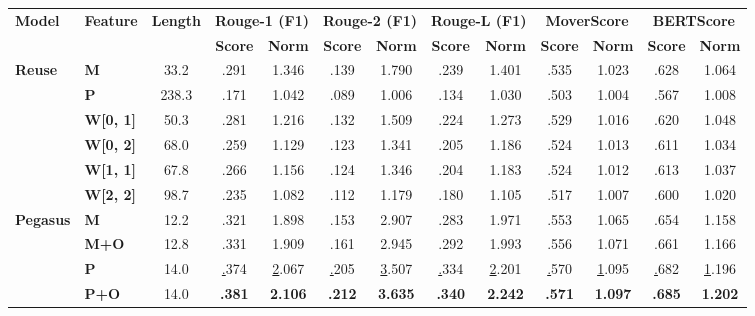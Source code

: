 \begin{table}[]
\centering \small
\addtolength{\tabcolsep}{-1.0mm}
\begin{tabular}{@{}llccccccccccc@{}}
\toprule
\multirow{2}{*}{\textbf{Model}} & \multirow{2}{*}{\textbf{Feature}} & \multirow{2}{*}{\textbf{Length}} & \multicolumn{2}{c}{\textbf{Rouge-1 (F1)}} & \multicolumn{2}{c}{\textbf{Rouge-2 (F1)}} & \multicolumn{2}{c}{\textbf{Rouge-L (F1)}} & \multicolumn{2}{c}{\textbf{MoverScore}} & \multicolumn{2}{c}{\textbf{BERTScore}} \\ \cmidrule(l){4-13}
 &  &  & \textbf{Score} & \textbf{Norm} & \textbf{Score} & \textbf{Norm} & \textbf{Score} & \textbf{Norm} & \textbf{Score} & \textbf{Norm} & \textbf{Score} & \textbf{Norm} \\ \midrule
\multirow{6}{*}{\textbf{Reuse}} & \textbf{M} & 33.2 & .291 & 1.346 & .139 & 1.790 & .239 & 1.401 & .535 & 1.023 & .628 & 1.064 \\
 & \textbf{P} & 238.3 & .171 & 1.042 & .089 & 1.006 & .134 & 1.030 & .503 & 1.004 & .567 & 1.008 \\
 & \textbf{W{[}0, 1{]}} & 50.3 & .281 & 1.216 & .132 & 1.509 & .224 & 1.273 & .529 & 1.016 & .620 & 1.048 \\
 & \textbf{W{[}0, 2{]}} & 68.0 & .259 & 1.129 & .123 & 1.341 & .205 & 1.186 & .524 & 1.013 & .611 & 1.034 \\
 & \textbf{W{[}1, 1{]}} & 67.8 & .266 & 1.156 & .124 & 1.346 & .204 & 1.183 & .524 & 1.012 & .613 & 1.037 \\
 & \textbf{W{[}2, 2{]}} & 98.7 & .235 & 1.082 & .112 & 1.179 & .180 & 1.105 & .517 & 1.007 & .600 & 1.020 \\ \midrule
\multirow{6}{*}{\textbf{Pegasus}} & \textbf{M} & 12.2 & .321 & 1.898 & .153 & 2.907 & .283 & 1.971 & .553 & 1.065 & .654 & 1.158 \\
 & \textbf{M+O} & 12.8 & .331 & 1.909 & .161 & 2.945 & .292 & 1.993 & .556 & 1.071 & .661 & 1.166 \\
 & \textbf{P} & 14.0 & {\ul .374} & {\ul 2.067} & {\ul .205} & {\ul 3.507} & {\ul .334} & {\ul 2.201} & {\ul .570} & {\ul 1.095} & {\ul .682} & {\ul 1.196} \\
 & \textbf{P+O} & 14.0 & \textbf{.381} & \textbf{2.106} & \textbf{.212} & \textbf{3.635} & \textbf{.340} & \textbf{2.242} & \textbf{.571} & \textbf{1.097} & \textbf{.685} & \textbf{1.202} \\

\end{tabular}
\end{table}
